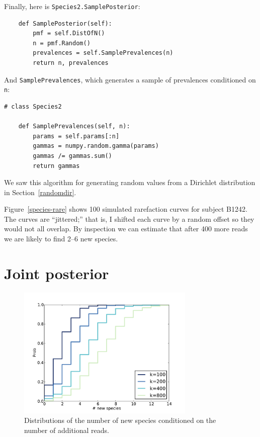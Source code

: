\documentclass[12pt]{book}
\begin{document}
Finally, here is {\tt Species2.SamplePosterior}:

\begin{verbatim}
    def SamplePosterior(self):
        pmf = self.DistOfN()
        n = pmf.Random()
        prevalences = self.SamplePrevalences(n)
        return n, prevalences
\end{verbatim}

And {\tt SamplePrevalences}, which generates a sample of
prevalences conditioned on {\tt n}:

\begin{verbatim}
# class Species2

    def SamplePrevalences(self, n):
        params = self.params[:n]
        gammas = numpy.random.gamma(params)
        gammas /= gammas.sum()
        return gammas
\end{verbatim}

We saw this algorithm for generating random values from a Dirichlet
distribution in Section~\ref{randomdir}.

Figure~\ref{species-rare} shows 100 simulated rarefaction curves
for subject B1242.  The curves are ``jittered;''
that is, I shifted each curve by a random offset so they
would not all overlap.  By inspection we can estimate that after
400 more reads we are likely to find 2--6 new species.


\section{Joint posterior}

\begin{figure}
\centerline{\includegraphics[height=2.5in]{figs/species-cond-B1242.pdf}}
\caption{Distributions of the number of new species conditioned on
the number of additional reads.}
\label{species-cond}
\end{figure}
\end{document}
